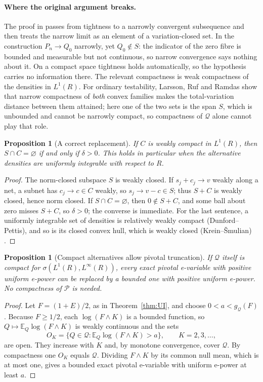 \documentclass[11pt,a4paper]{article}
\newtheorem{proposition}[theorem]{Proposition}
\theoremstyle{definition}
\theoremstyle{remark}
\newcommand{\PP}{\mathcal P}
\newcommand{\QQ}{\mathcal Q}
\newcommand{\EE}{\mathbb E}
\begin{document}
\paragraph{Where the original argument breaks.} The proof in \cite{ZRW} passes from tightness to a narrowly convergent subsequence and then treats the narrow limit as an element of a variation-closed set. In the construction \(P_n\to Q_0\) narrowly, yet \(Q_0\notin S\): the indicator of the zero fibre is bounded and measurable but not continuous, so narrow convergence says nothing about it. On a compact space tightness holds automatically, so the hypothesis carries no information there. The relevant compactness is weak compactness of the densities in \(L^1(R)\). For ordinary testability, Larsson, Ruf and Ramdas \cite[Theorem~1.8]{LRR} show that narrow compactness of \emph{both} convex families makes the total-variation distance between them attained; here one of the two sets is the span \(S\), which is unbounded and cannot be narrowly compact, so compactness of \(\QQ\) alone cannot play that role.

\begin{proposition}[A correct replacement]\label{prop:weakcompact}
If \(C\) is weakly compact in \(L^1(R)\), then \(S\cap C=\varnothing\) if and only if \(\delta>0\). This holds in particular when the alternative densities are uniformly integrable with respect to \(R\).
\end{proposition}
\begin{proof}
The norm-closed subspace \(S\) is weakly closed. If \(s_j+c_j\to v\) weakly along a net, a subnet has \(c_j\to c\in C\) weakly, so \(s_j\to v-c\in S\); thus \(S+C\) is weakly closed, hence norm closed. If \(S\cap C=\varnothing\), then \(0\notin S+C\), and some ball about zero misses \(S+C\), so \(\delta>0\); the converse is immediate. For the last sentence, a uniformly integrable set of densities is relatively weakly compact (Dunford--Pettis), and so is its closed convex hull, which is weakly closed (Krein--\v Smulian) \cite[Chapter~5]{AlbiacKalton}.
\end{proof}

\begin{proposition}[Compact alternatives allow pivotal truncation]\label{prop:compacttruncate}
If \(\QQ\) itself is compact for \(\sigma(L^1(R),L^\infty(R))\), every exact pivotal e-variable with positive uniform e-power can be replaced by a bounded one with positive uniform e-power. No compactness of \(\PP\) is needed.
\end{proposition}
\begin{proof}
Let \(F=(1+E)/2\), as in Theorem~\ref{thm:UI}, and choose \(0<a<g_{\QQ}(F)\). Because \(F\ge1/2\), each \(\log(F\wedge K)\) is a bounded function, so \(Q\mapsto\EE_Q\log(F\wedge K)\) is weakly continuous and the sets
\[
 O_K=\{Q\in\QQ:\EE_Q\log(F\wedge K)>a\},\qquad K=2,3,\dots,
\]
are open. They increase with \(K\) and, by monotone convergence, cover \(\QQ\). By compactness one \(O_K\) equals \(\QQ\). Dividing \(F\wedge K\) by its common null mean, which is at most one, gives a bounded exact pivotal e-variable with uniform e-power at least \(a\).
\end{proof}
\end{document}
